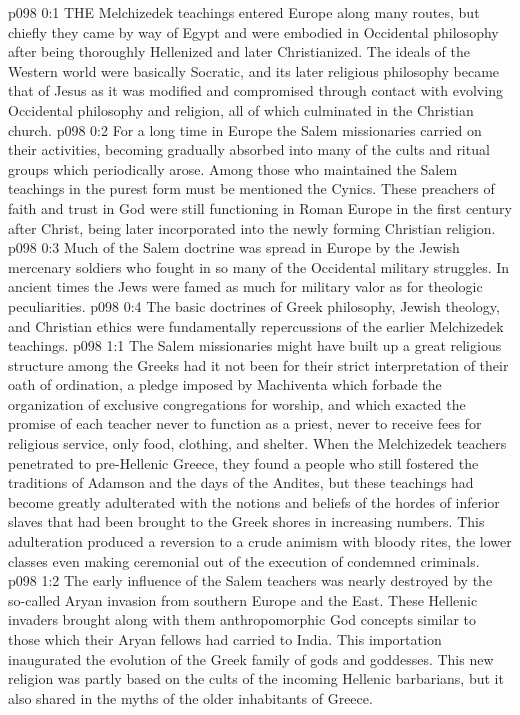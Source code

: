 \vs p098 0:1 THE Melchizedek teachings entered Europe along many routes, but chiefly they came by way of Egypt and were embodied in Occidental philosophy after being thoroughly Hellenized and later Christianized. The ideals of the Western world were basically Socratic, and its later religious philosophy became that of Jesus as it was modified and compromised through contact with evolving Occidental philosophy and religion, all of which culminated in the Christian church.
\vs p098 0:2 For a long time in Europe the Salem missionaries carried on their activities, becoming gradually absorbed into many of the cults and ritual groups which periodically arose. Among those who maintained the Salem teachings in the purest form must be mentioned the Cynics. These preachers of faith and trust in God were still functioning in Roman Europe in the first century after Christ, being later incorporated into the newly forming Christian religion.
\vs p098 0:3 Much of the Salem doctrine was spread in Europe by the Jewish mercenary soldiers who fought in so many of the Occidental military struggles. In ancient times the Jews were famed as much for military valor as for theologic peculiarities.
\vs p098 0:4 The basic doctrines of Greek philosophy, Jewish theology, and Christian ethics were fundamentally repercussions of the earlier Melchizedek teachings.
\vs p098 1:1 The Salem missionaries might have built up a great religious structure among the Greeks had it not been for their strict interpretation of their oath of ordination, a pledge imposed by Machiventa which forbade the organization of exclusive congregations for worship, and which exacted the promise of each teacher never to function as a priest, never to receive fees for religious service, only food, clothing, and shelter. When the Melchizedek teachers penetrated to pre\hyp{}Hellenic Greece, they found a people who still fostered the traditions of Adamson and the days of the Andites, but these teachings had become greatly adulterated with the notions and beliefs of the hordes of inferior slaves that had been brought to the Greek shores in increasing numbers. This adulteration produced a reversion to a crude animism with bloody rites, the lower classes even making ceremonial out of the execution of condemned criminals.
\vs p098 1:2 The early influence of the Salem teachers was nearly destroyed by the so\hyp{}called Aryan invasion from southern Europe and the East. These Hellenic invaders brought along with them anthropomorphic God concepts similar to those which their Aryan fellows had carried to India. This importation inaugurated the evolution of the Greek family of gods and goddesses. This new religion was partly based on the cults of the incoming Hellenic barbarians, but it also shared in the myths of the older inhabitants of Greece.

